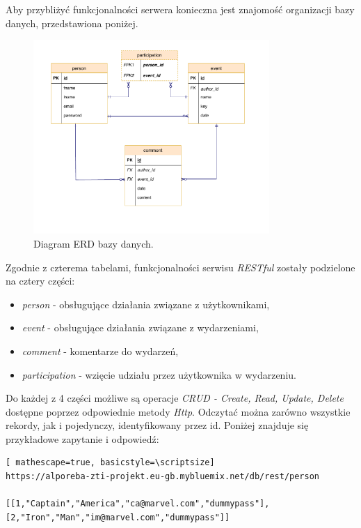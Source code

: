 \documentclass[12pt]{article}
\begin{document}
Aby przybliżyć funkcjonalności serwera konieczna jest znajomość organizacji bazy danych, przedstawiona poniżej.

\begin{figure}[H]
\centering
\includegraphics[width=0.8\textwidth]{erd.pdf}
\caption{Diagram ERD bazy danych.}
\end{figure}

Zgodnie z czterema tabelami, funkcjonalności serwisu \textit{RESTful} zostały podzielone na cztery części: 
\begin{itemize}
\item \textit{person} - obsługujące działania związane z użytkownikami, 
\item \textit{event} - obsługujące działania związane z wydarzeniami, 
\item \textit{comment} - komentarze do wydarzeń,
\item \textit{participation} - wzięcie udziału przez użytkownika w wydarzeniu.
\end{itemize}

Do każdej z 4 części możliwe są operacje \textit{CRUD - Create, Read, Update, Delete} dostępne poprzez odpowiednie metody \textit{Http}. Odczytać można zarówno wszystkie rekordy, jak i pojedynczy, identyfikowany przez id. Poniżej znajduje się przykładowe zapytanie i odpowiedź:

\begin{lstlisting}[ mathescape=true, basicstyle=\scriptsize]
https://alporeba-zti-projekt.eu-gb.mybluemix.net/db/rest/person

[[1,"Captain","America","ca@marvel.com","dummypass"],[2,"Iron","Man","im@marvel.com","dummypass"]]
\end{lstlisting}
\end{document}
